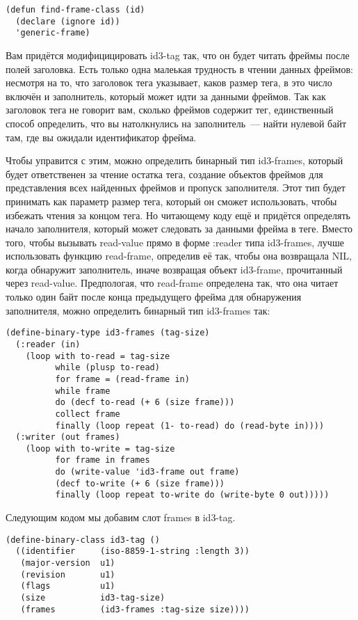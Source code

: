 \begin{lstlisting}
(defun find-frame-class (id)
  (declare (ignore id))
  'generic-frame)
\end{lstlisting}

Вам придётся модифицицировать id3-tag так, что он будет читать фреймы после полей
заголовка. Есть только одна малеькая трудность в чтении данных фреймов: несмотря на то,
что заголовок тега указывает, каков размер тега, в это число включён и заполнитель,
который может идти за данными фреймов. Так как заголовок тега не говорит вам, сколько
фреймов содержит тег, единственный способ определить, что вы натолкнулись на
заполнитель~--- найти нулевой байт там, где вы ожидали идентификатор фрейма.

Чтобы управится с этим, можно определить бинарный тип id3-frames, который будет
ответственен за чтение остатка тега, создание объектов фреймов для представления всех
найденных фреймов и пропуск заполнителя. Этот тип будет принимать как параметр размер
тега, который он сможет использовать, чтобы избежать чтения за концом тега. Но читающему
коду ещё и придётся определять начало заполнителя, который может следовать за данными
фрейма в теге. Вместо того, чтобы вызывать read-value прямо в форме :reader типа
id3-frames, лучше использовать функцию read-frame, определив её так, чтобы она возвращала
NIL, когда обнаружит заполнитель, иначе возвращая объект id3-frame, прочитанный через
read-value. Предпологая, что read-frame определена так, что она читает только один байт
после конца предыдущего фрейма для обнаружения заполнителя, можно определить бинарный тип
id3-frames так:

\begin{lstlisting}
(define-binary-type id3-frames (tag-size)
  (:reader (in)
    (loop with to-read = tag-size
          while (plusp to-read)
          for frame = (read-frame in)
          while frame
          do (decf to-read (+ 6 (size frame)))
          collect frame
          finally (loop repeat (1- to-read) do (read-byte in))))
  (:writer (out frames)
    (loop with to-write = tag-size
          for frame in frames
          do (write-value 'id3-frame out frame)
          (decf to-write (+ 6 (size frame)))
          finally (loop repeat to-write do (write-byte 0 out)))))
\end{lstlisting}

Следующим кодом мы добавим слот frames в id3-tag.

\begin{lstlisting}
(define-binary-class id3-tag ()
  ((identifier     (iso-8859-1-string :length 3))
   (major-version  u1)
   (revision       u1)
   (flags          u1)
   (size           id3-tag-size)
   (frames         (id3-frames :tag-size size))))
\end{lstlisting}

